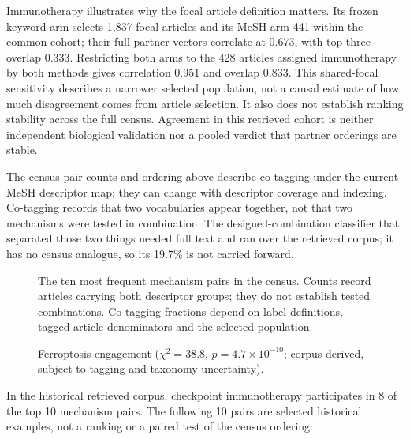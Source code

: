 \documentclass[11pt,twoside,openright]{report}
\begin{document}
Immunotherapy illustrates why the focal article definition matters. Its frozen keyword arm selects 1,837 focal articles and its MeSH arm 441 within the common cohort; their full partner vectors correlate at 0.673, with top-three overlap 0.333. Restricting both arms to the 428 articles assigned immunotherapy by both methods gives correlation 0.951 and overlap 0.833. This shared-focal sensitivity describes a narrower selected population, not a causal estimate of how much disagreement comes from article selection. It also does not establish ranking stability across the full census. Agreement in this retrieved cohort is neither independent biological validation nor a pooled verdict that partner orderings are stable.

The census pair counts and ordering above describe co-tagging under the current MeSH descriptor map; they can change with descriptor coverage and indexing. Co-tagging records that two vocabularies appear together, not that two mechanisms were tested in combination. The designed-combination classifier that separated those two things needed full text and ran over the retrieved corpus; it has no census analogue, so its 19.7\% is not carried forward.

\begin{figure}[tbp]
\setcounter{figure}{11}
\caption{The ten most frequent mechanism pairs in the census. Counts record articles carrying both descriptor groups; they do not establish tested combinations. Co-tagging fractions depend on label definitions, tagged-article denominators and the selected population.}
\label{fig:fig15c_mechanism_pairs}
\end{figure}

\begin{figure}[tbp]
\setcounter{figure}{2}
\caption{Ferroptosis engagement ($\chi^2=38.8$, $p=4.7\times10^{-10}$; corpus-derived, subject to tagging and taxonomy uncertainty).}
\label{fig:fig1_ferroptosis_comparison}
\end{figure}

In the historical retrieved corpus, checkpoint immunotherapy participates in 8 of the top 10 mechanism pairs. The following 10 pairs are selected historical examples, not a ranking or a paired test of the census ordering:
\end{document}
